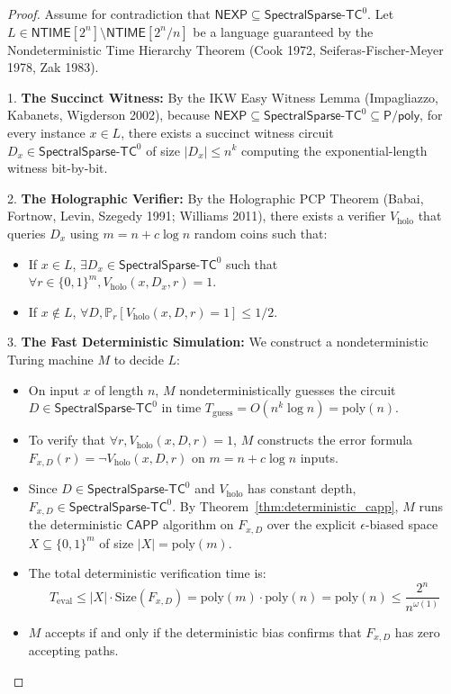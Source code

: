 \documentclass[11pt,a4paper]{article}
\theoremstyle{definition}
\theoremstyle{remark}
\newcommand{\Ppoly}{\mathsf{P/poly}}
\newcommand{\NEXP}{\mathsf{NEXP}}
\newcommand{\NTIME}{\mathsf{NTIME}}
\newcommand{\CAPP}{\mathsf{CAPP}}
\newcommand{\SparseTC}{\mathsf{SpectralSparse}\text{-}\mathsf{TC}^0}
\begin{document}
\begin{proof}
Assume for contradiction that $\NEXP \subseteq \SparseTC$.
Let $L \in \NTIME[2^n] \setminus \NTIME[2^n / n]$ be a language guaranteed by the Nondeterministic Time Hierarchy Theorem (Cook 1972, Seiferas-Fischer-Meyer 1978, Zak 1983).

1. \textbf{The Succinct Witness:} By the IKW Easy Witness Lemma (Impagliazzo, Kabanets, Wigderson 2002), because $\NEXP \subseteq \SparseTC \subseteq \Ppoly$, for every instance $x \in L$, there exists a succinct witness circuit $D_x \in \SparseTC$ of size $|D_x| \le n^k$ computing the exponential-length witness bit-by-bit.

2. \textbf{The Holographic Verifier:} By the Holographic PCP Theorem (Babai, Fortnow, Levin, Szegedy 1991; Williams 2011), there exists a verifier $V_{\mathrm{holo}}$ that queries $D_x$ using $m = n + c \log n$ random coins such that:
\begin{itemize}
    \item If $x \in L$, $\exists D_x \in \SparseTC$ such that $\forall r \in \{0,1\}^m, V_{\mathrm{holo}}(x, D_x, r) = 1$.
    \item If $x \notin L$, $\forall D, \mathbb{P}_r[V_{\mathrm{holo}}(x, D, r) = 1] \le 1/2$.
\end{itemize}

3. \textbf{The Fast Deterministic Simulation:} We construct a nondeterministic Turing machine $M$ to decide $L$:
\begin{itemize}
    \item On input $x$ of length $n$, $M$ nondeterministically guesses the circuit $D \in \SparseTC$ in time $T_{\mathrm{guess}} = O(n^k \log n) = \mathrm{poly}(n)$.
    \item To verify that $\forall r, V_{\mathrm{holo}}(x, D, r) = 1$, $M$ constructs the error formula $F_{x,D}(r) = \neg V_{\mathrm{holo}}(x, D, r)$ on $m = n + c \log n$ inputs.
    \item Since $D \in \SparseTC$ and $V_{\mathrm{holo}}$ has constant depth, $F_{x,D} \in \SparseTC$. By Theorem~\ref{thm:deterministic_capp}, $M$ runs the deterministic $\CAPP$ algorithm on $F_{x,D}$ over the explicit $\epsilon$-biased space $X \subseteq \{0,1\}^m$ of size $|X| = \mathrm{poly}(m)$.
    \item The total deterministic verification time is:
    \[
    T_{\mathrm{eval}} \le |X| \cdot \mathrm{Size}(F_{x,D}) = \mathrm{poly}(m) \cdot \mathrm{poly}(n) = \mathrm{poly}(n) \le \frac{2^n}{n^{\omega(1)}}
    \]
    \item $M$ accepts if and only if the deterministic bias confirms that $F_{x,D}$ has zero accepting paths.
\end{itemize}


\end{proof}
\end{document}
